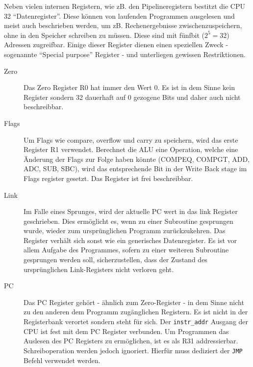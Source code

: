 \documentclass[paper=a4,fontsize=12pt,twocolumn]{scrreprt}
\begin{document}
Neben vielen internen Registern, wie zB. den Pipelineregistern bestitzt die CPU 32 \enquote{Datenregister}.
Diese können von laufenden Programmen ausgelesen und meist auch beschrieben werden, um zB. Rechenergebnisse zwischenzuspeichern, ohne in den Speicher schreiben zu müssen. 
Diese sind mit fünfbit ($2^5 = 32$) Adressen zugreifbar. 
Einige dieser Register dienen einen speziellen Zweck - sogenannte \enquote{Special purpose} Register - und unterliegen gewissen Restriktionen.
\begin{description}
    \item[Zero]
        Das Zero Register R0 hat immer den Wert $0$.
        Es ist in dem Sinne kein Register sondern 32 dauerhaft auf 0 gezogene Bits und daher auch nicht beschreibbar.
    \item[Flags]
        Um Flags wie compare, overflow und carry zu speichern, wird das erste Register R1 verwendet.
        Berechnet die ALU eine Operation, welche eine Änderung der Flags zur Folge haben könnte (COMPEQ, COMPGT, ADD, ADC, SUB, SBC), wird das entsprechende Bit in der Write Back stage im Flags register gesetzt.
        Das Register ist frei beschreibbar.
    \item[Link]
        Im Falle eines Sprunges, wird der aktuelle PC wert in das link Register geschrieben.
        Dies ermöglicht es, wenn zu einer Subroutine gesprungen wurde, wieder zum ursprünglichen Programm zurückzukehren.
        Das Register verhält sich sonst wie ein generisches Datenregister.
        Es ist vor allem Aufgabe des Programmes, sofern zu einer weiteren Subroutine gesprungen werden soll, sicherzustellen, dass der Zustand des ursprünglichen Link-Registers nicht verloren geht.
    \item[PC]
        Das PC Register gehört - ähnlich zum Zero-Register - in dem Sinne nicht zu den anderen dem Programm zugänglichen Registern.
        Es ist nicht in der Registerbank verortet sondern steht für sich.
        Der \texttt{instr\_addr} Ausgang der CPU ist fest mit dem PC Register verbunden.
        Um Programmen das Auslesen des PC Registers zu ermöglichen, ist es als R31 addressierbar. Schreiboperation werden jedoch ignoriert.
        Hierfür muss dediziert der \texttt{JMP} Befehl verwendet werden.
\end{description}

\end{document}
